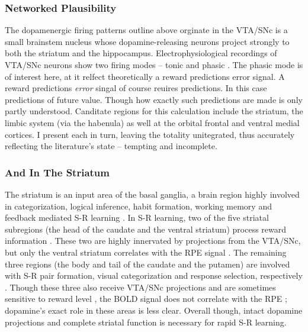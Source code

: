 \documentclass[doc,12pt]{apa}        %
\begin{document}
\subsubsection{Networked Plausibility}
\label{sub:net_plaus}
The dopamenergic firing patterns outline above orginate in the VTA/SNc is a small brainstem nucleus whose dopamine-releasing neurons project strongly to both the striatum and the hippocampus.  Electrophysiological recordings of VTA/SNc neurons show two firing modes -- tonic and phasic \cite{DawNW:2006p6343}.  The phasic mode is of interest here, at it relfect theoretically a reward predictions error signal. A reward predictions \emph{error} singal of course reuires predictions.  In this case predictions of future value.  Though how exactly such predictions are made is only partly understood.  Canditate regions for this calculation include the striatum, the limbic system (via the habenula) as well at the orbital frontal and ventral medial cortices.  I present each in turn, leaving the totality unitegrated, thus accurately reflecting the literature's state -- tempting and incomplete.

\subsubsection{And In The Striatum}
\label{sub:in_the_str}
The striatum is an input area of the basal ganglia, a brain region highly involved in categorization, logical inference, habit formation, working memory and feedback mediated S-R learning \cite{Frank:2001p1996,Jin:2010p7199,SchmitzerTorbert:2004p5410,Seger:2008p6401,Seger:2010p7189,Yin:2006p5080}.  In S-R learning, two of the five striatal subregions (the head of the caudate and the ventral striatum) process reward information \cite{Yin:2005p5101,Yin:2008p6347,Schonberg:2009p6669}.  These two are highly innervated by projections from the VTA/SNc, but only the ventral striatum correlates with the RPE signal \cite{Haruno:2006p3979,Seger:2010p7189}.  The remaining three regions (the body and tail of the caudate and the putamen) are involved with S-R pair formation, visual categorization and response selection, respectively \cite{Seger:2008p6401,Seger:2010p7189}.  Though these three also receive VTA/SNc projections and are sometimes sensitive to reward level \cite{BischoffGrethe:2009p4570}, the BOLD signal does not correlate with the RPE \cite{Seger:2010p7189}; dopamine's exact role in these areas is less clear.  Overall though, intact dopamine projections and complete striatal function is necessary for rapid S-R learning.
   
\end{document}
